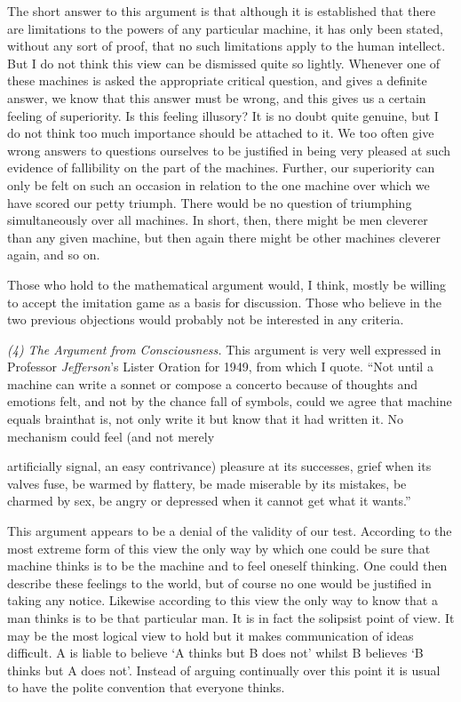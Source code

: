 \documentclass[10pt]{article} %
\begin{document}
The short answer to this argument is that although it is established that there are limitations to the powers of any particular machine, it has only been stated, without any sort of proof, that no such limitations apply to the human intellect. But I do not think this view can be dismissed quite so lightly. Whenever one of these machines is asked the appropriate critical question, and gives a definite answer, we know that this answer must be wrong, and this gives us a certain feeling of superiority. Is this feeling illusory? It is no doubt quite genuine, but I do not think too much importance should be attached to it. We too often give wrong answers to questions ourselves to be justified in being very pleased at such evidence of fallibility on the part of the machines. Further, our superiority can only be felt on such an occasion in relation to the one machine over which we have scored our petty triumph. There would be no question of triumphing simultaneously over all machines. In short, then, there might be men cleverer than any given machine, but then again there might be other machines cleverer again, and so on.

Those who hold to the mathematical argument would, I think, mostly be willing to accept the imitation game as a basis for discussion. Those who believe in the two previous objections would probably not be interested in any criteria.
\vspace{0.5\baselineskip} %

\noindent\normalfont \textit{(4) The Argument from Consciousness.} This argument is very well expressed in Professor \textit{Jefferson}'s Lister Oration for 1949, from which I quote. ``Not until a machine can write a sonnet or compose a concerto because of thoughts and emotions felt, and not by the chance fall of symbols, could we agree that machine equals brain\textemdash that is, not only write it but know that it had written it. No mechanism could feel (and not merely

artificially signal, an easy contrivance) pleasure at its successes, grief when its valves fuse, be warmed by flattery, be made miserable by its mistakes, be charmed by sex, be angry or depressed when it cannot get what it wants.''

This argument appears to be a denial of the validity of our test. According to the most extreme form of this view the only way by which one could be sure that machine thinks is to be the machine and to feel oneself thinking. One could then describe these feelings to the world, but of course no one would be justified in taking any notice. Likewise according to this view the only way to know that a man thinks is to be that particular man. It is in fact the solipsist point of view. It may be the most logical view to hold but it makes communication of ideas difficult. A is liable to believe `A thinks but B does not' whilst B believes `B thinks but A does not'. Instead of arguing continually over this point it is usual to have the polite convention that everyone thinks.
\end{document}
